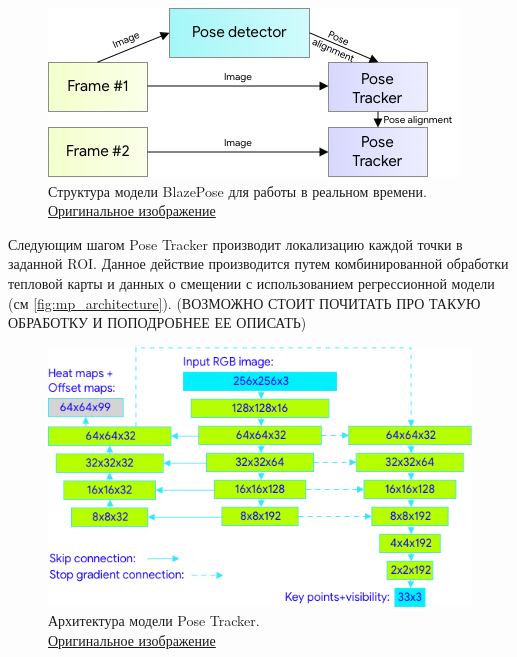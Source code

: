\begin{figure}[h]
	\centering
	\includegraphics[width=\textwidth * 4 / 5]{./images/MPPose/Model_structure.jpg}
	\caption{Структура модели BlazePose для работы в реальном времени.\\ \href{https://1.bp.blogspot.com/-J66lTDBjlgw/XzVwzgeQJ7I/AAAAAAAAGYM/WBIhbOqzi4ICUswEOHv8r7ItJIOJgL9iwCLcBGAsYHQ/s411/image11.jpg}{Оригинальное изображение}}
	\label{fig:mp_model_structure}
\end{figure}

Следующим шагом Pose Tracker производит локализацию каждой точки в заданной ROI. Данное действие производится путем комбинированной обработки тепловой карты и данных о смещении с использованием регрессионной модели (см \autoref{fig:mp_architecture}). (ВОЗМОЖНО СТОИТ ПОЧИТАТЬ ПРО ТАКУЮ ОБРАБОТКУ И ПОПОДРОБНЕЕ ЕЕ ОПИСАТЬ)

\begin{figure}[h]
	\centering
	\includegraphics[width=\textwidth * 4 / 5]{./images/MPPose/architecture.jpg}
	\caption{Архитектура модели Pose Tracker.\\ \href{https://1.bp.blogspot.com/-XxKesnBALGM/XzVxSKZNWZI/AAAAAAAAGYc/WOt31icjp_YyjMxz06RSEwTi9K3qviFxwCLcBGAsYHQ/s550/image9.jpg}{Оригинальное изображение}}
	\label{fig:mp_architecture}
\end{figure}

